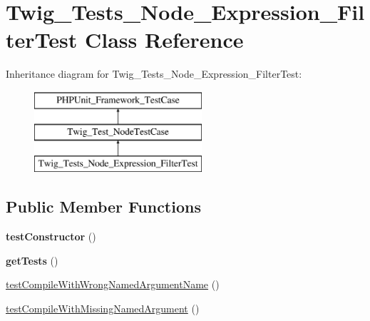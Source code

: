 \hypertarget{classTwig__Tests__Node__Expression__FilterTest}{}\section{Twig\+\_\+\+Tests\+\_\+\+Node\+\_\+\+Expression\+\_\+\+Filter\+Test Class Reference}
\label{classTwig__Tests__Node__Expression__FilterTest}
Inheritance diagram for Twig\+\_\+\+Tests\+\_\+\+Node\+\_\+\+Expression\+\_\+\+Filter\+Test\+:\begin{figure}[H]
\begin{center}
\leavevmode
\includegraphics[height=3.000000cm]{classTwig__Tests__Node__Expression__FilterTest}
\end{center}
\end{figure}
\subsection*{Public Member Functions}
\begin{DoxyCompactItemize}
\item 
{\bfseries test\+Constructor} ()\hypertarget{classTwig__Tests__Node__Expression__FilterTest_a162a9cacd82393f8d7956c11b0a37b65}{}\label{classTwig__Tests__Node__Expression__FilterTest_a162a9cacd82393f8d7956c11b0a37b65}

\item 
{\bfseries get\+Tests} ()\hypertarget{classTwig__Tests__Node__Expression__FilterTest_a645e2c88ef6f4b4990c4a8b976639ee0}{}\label{classTwig__Tests__Node__Expression__FilterTest_a645e2c88ef6f4b4990c4a8b976639ee0}

\item 
\hyperlink{classTwig__Tests__Node__Expression__FilterTest_a666e1a23510d49fdd4f8d55f32123858}{test\+Compile\+With\+Wrong\+Named\+Argument\+Name} ()
\item 
\hyperlink{classTwig__Tests__Node__Expression__FilterTest_ae264429f9345d88c1934e6daa93234b8}{test\+Compile\+With\+Missing\+Named\+Argument} ()
\end{DoxyCompactItemize}

